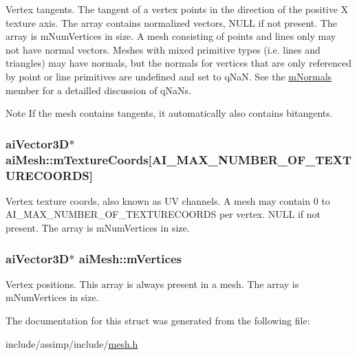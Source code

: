 Vertex tangents. The tangent of a vertex points in the direction of the positive X texture axis. The array contains normalized vectors, N\-U\-L\-L if not present. The array is m\-Num\-Vertices in size. A mesh consisting of points and lines only may not have normal vectors. Meshes with mixed primitive types (i.\-e. lines and triangles) may have normals, but the normals for vertices that are only referenced by point or line primitives are undefined and set to q\-Na\-N. See the \hyperlink{structai_mesh_aec81b496b4d93838cef038933dabe9b9}{m\-Normals} member for a detailled discussion of q\-Na\-Ns. \begin{DoxyNote}{Note}
If the mesh contains tangents, it automatically also contains bitangents. 
\end{DoxyNote}
\hypertarget{structai_mesh_a4a50b11d00ef50f419c75cab0f6bddd6}{
\subsubsection[{m\-Texture\-Coords}]{ {\bf ai\-Vector3\-D}$\ast$ ai\-Mesh\-::m\-Texture\-Coords\mbox{[}{\bf A\-I\-\_\-\-M\-A\-X\-\_\-\-N\-U\-M\-B\-E\-R\-\_\-\-O\-F\-\_\-\-T\-E\-X\-T\-U\-R\-E\-C\-O\-O\-R\-D\-S}\mbox{]}}}\label{structai_mesh_a4a50b11d00ef50f419c75cab0f6bddd6}
Vertex texture coords, also known as U\-V channels. A mesh may contain 0 to A\-I\-\_\-\-M\-A\-X\-\_\-\-N\-U\-M\-B\-E\-R\-\_\-\-O\-F\-\_\-\-T\-E\-X\-T\-U\-R\-E\-C\-O\-O\-R\-D\-S per vertex. N\-U\-L\-L if not present. The array is m\-Num\-Vertices in size. \hypertarget{structai_mesh_afd4588abb3e1c72821ae0234a3850662}{
\subsubsection[{m\-Vertices}]{ {\bf ai\-Vector3\-D}$\ast$ ai\-Mesh\-::m\-Vertices}}\label{structai_mesh_afd4588abb3e1c72821ae0234a3850662}
Vertex positions. This array is always present in a mesh. The array is m\-Num\-Vertices in size. 

The documentation for this struct was generated from the following file\-:\begin{DoxyCompactItemize}
\item 
include/assimp/include/\hyperlink{mesh_8h}{mesh.\-h}\end{DoxyCompactItemize}
